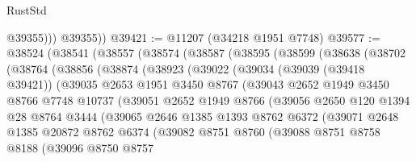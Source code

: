 \begin{lexlean}{RustStd}
\begin{coremodule}
              @39355)))
        @39355))
@39421 := @11207 (@34218 @1951 @7748)
@39577 := @38524
    (@38541
      (@38557
        (@38574
          (@38587
            (@38595
              (@38599
                (@38638
                  (@38702
                    (@38764
                      (@38856
                        (@38874
                          (@38923
                            (@39022
                              (@39034
                                (@39039 (@39418 @39421))
                                (@39035
                                  @2653
                                  @1951
                                  @3450
                                  @8767
                                  (@39043
                                    @2652
                                    @1949
                                    @3450
                                    @8766
                                    @7748
                                    @10737
                                    (@39051
                                      @2652
                                      @1949
                                      @8766
                                      (@39056
                                        @2650
                                        @120
                                        @1394
                                        @28
                                        @8764
                                        @3444
                                        (@39065
                                          @2646
                                          @1385
                                          @1393
                                          @8762
                                          @6372
                                          (@39071
                                            @2648
                                            @1385
                                            @20872
                                            @8762
                                            @6374
                                            (@39082
                                              @8751
                                              @8760
                                              (@39088
                                                @8751
                                                @8758
                                                @8188
                                                (@39096
                                                  @8750
                                                  @8757

\end{coremodule}
\end{lexlean}
